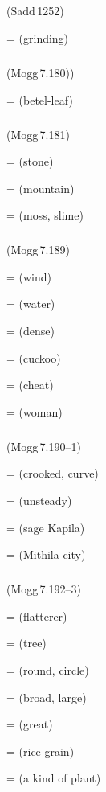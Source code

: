 \subparagraph*{} (Sadd\,1252)\label{pacckx:chilla}

 =  (grinding)\par

\subparagraph*{} (Mogg\,7.180))\label{pacckx:buula}

 =  (betel-leaf)\par

\subparagraph*{} (Mogg\,7.181)\label{pacckx:laka}\label{pacckx:vaala}

 =  (stone)\par
{} =  (mountain)\par
{} =  (moss, slime)\par

\subparagraph*{} (Mogg\,7.189)\label{pacckx:ila}

 =  (wind)\par
{} =  (water)\par
{} =  (dense)\par
{} =  (cuckoo)\par
{} =  (cheat)\par
{} =  (woman)\par

\subparagraph*{} (Mogg\,7.190--1)\label{pacckx:kila}

 =  (crooked, curve)\par
{} =  (unsteady)\par
{} =  (sage Kapila)\par
{} =  (Mithil\=a city)\par

\subparagraph*{} (Mogg\,7.192--3)\label{pacckx:kula}

 =  (flatterer)\par
{} =  (tree)\par
{} =  (round, circle)\par
{} =  (broad, large)\par
{} =  (great)\par
{} =  (rice-grain)\par
{} =  (a kind of plant)\par

